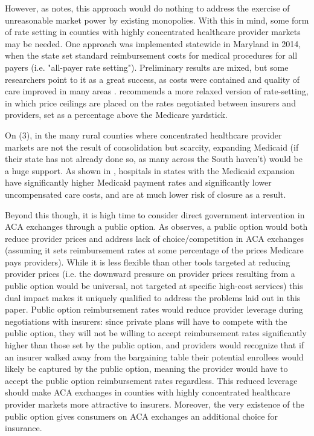 \documentclass[12pt,letterpaper]{article}
\begin{document}
However, as \citet{berenson_addressing_2015} notes, this approach would do nothing to address the exercise of unreasonable market power by existing monopolies. With this in mind, some form of rate setting in counties with highly concentrated healthcare provider markets may be needed. One approach was implemented statewide in Maryland in 2014, when the state set standard reimbursement costs for medical procedures for all payers (i.e. "all-payer rate setting"). Preliminary results are mixed, but some researchers point to it as a great success, as costs were contained and quality of care improved in many areas \citep{rajkumar_marylands_2014}. \citet{berenson_addressing_2015} recommends a more relaxed version of rate-setting, in which price ceilings are placed on the rates negotiated between insurers and providers, set as a percentage above the Medicare yardstick.

On (3), in the many rural counties where concentrated healthcare provider markets are not the result of consolidation but scarcity, expanding Medicaid (if their state has not already done so, as many across the South haven't) would be a huge support. As shown in \citet{blavin_medicaid_2021}, hospitals in states with the Medicaid expansion have significantly higher Medicaid payment rates and significantly lower uncompensated care costs, and are at much lower risk of closure as a result.

Beyond this though, it is high time to consider direct government intervention in ACA exchanges through a public option. As \citet{fiedler_capping_2020} observes, a public option would both reduce provider prices and address lack of choice/competition in ACA exchanges (assuming it sets reimbursement rates at some percentage of the prices Medicare pays providers). While it is less flexible than other tools targeted at reducing provider prices (i.e. the downward pressure on provider prices resulting from a public option would be universal, not targeted at specific high-cost services) this dual impact makes it uniquely qualified to address the problems laid out in this paper. Public option reimbursement rates would reduce provider leverage during negotiations with insurers: since private plans will have to compete with the public option, they will not be willing to accept reimbursement rates significantly higher than those set by the public option, and providers would recognize that if an insurer walked away from the bargaining table their potential enrollees would likely be captured by the public option, meaning the provider would have to accept the public option reimbursement rates regardless. This reduced leverage should make ACA exchanges in counties with highly concentrated healthcare provider markets more attractive to insurers. Moreover, the very existence of the public option gives consumers on ACA exchanges an additional choice for insurance.
\end{document}
